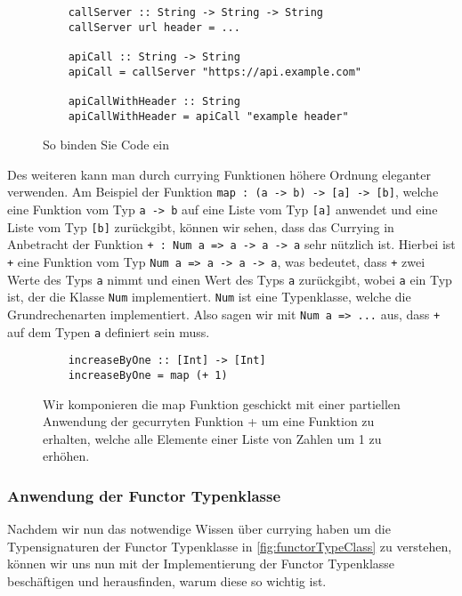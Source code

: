 \documentclass{hhuarticle}
\theoremstyle{definition}
\theoremstyle{theorem}
\begin{document}
  \begin{figure}[h]

    \begin{verbatim}
    callServer :: String -> String -> String
    callServer url header = ...

    apiCall :: String -> String
    apiCall = callServer "https://api.example.com"

    apiCallWithHeader :: String
    apiCallWithHeader = apiCall "example header"
    \end{verbatim}
    \caption{So binden Sie Code ein}%
    \label{fig:curryingExample}
  \end{figure}

  Des weiteren kann man durch currying Funktionen höhere Ordnung
  eleganter verwenden. Am Beispiel der Funktion \verb|map : (a -> b) -> [a] -> [b]|,
  welche eine Funktion vom Typ \verb|a -> b| auf eine Liste vom Typ \verb|[a]| anwendet
  und eine Liste vom Typ \verb|[b]| zurückgibt, können wir sehen, dass
  das Currying in Anbetracht der Funktion \verb|+ : Num a => a -> a -> a| sehr nützlich ist.
  Hierbei ist \verb|+| eine Funktion vom Typ \verb|Num a => a -> a -> a|,
  was bedeutet, dass \verb|+| zwei Werte des Typs \verb|a| nimmt und einen Wert
  des Typs \verb|a| zurückgibt, wobei \verb|a| ein Typ ist, der die Klasse \verb|Num| implementiert.
  \verb|Num| ist eine Typenklasse, welche die Grundrechenarten implementiert.
  Also sagen wir mit \verb|Num a => ...| aus, dass \verb|+| auf dem
  Typen \verb|a| definiert sein muss.

  \begin{figure}[h]

    \begin{verbatim}
    increaseByOne :: [Int] -> [Int]
    increaseByOne = map (+ 1)
    \end{verbatim}
    \caption{Wir komponieren die map Funktion geschickt mit einer partiellen Anwendung der gecurryten Funktion + um eine Funktion zu erhalten, welche alle Elemente einer Liste von Zahlen um 1 zu erhöhen.}%
    \label{fig:currying1}
  \end{figure}

  \subsubsection{Anwendung der Functor Typenklasse}

  Nachdem wir nun das notwendige Wissen über currying haben um 
  die Typensignaturen der Functor Typenklasse in \cref{fig:functorTypeClass}
  zu verstehen, können wir uns nun mit der Implementierung der Functor Typenklasse
  beschäftigen und herausfinden, warum diese so wichtig ist.
\end{document}
